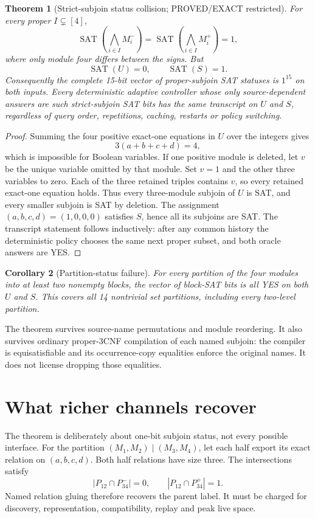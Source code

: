 \documentclass[11pt]{article}
\newtheorem{theorem}{Theorem}
\newtheorem{corollary}[theorem]{Corollary}
\newcommand{\SAT}{\operatorname{SAT}}
\begin{document}
\begin{theorem}[Strict-subjoin status collision; PROVED/EXACT restricted]
For every proper \(I\subsetneq[4]\),
\[
\SAT\!\left(\bigwedge_{i\in I}M_i^-\right)=
\SAT\!\left(\bigwedge_{i\in I}M_i^+\right)=1,
\]
where only module four differs between the signs.  But
\[
\SAT(U)=0,\qquad \SAT(S)=1.
\]
Consequently the complete 15-bit vector of proper-subjoin SAT statuses is
\(1^{15}\) on both inputs.  Every deterministic adaptive controller whose
only source-dependent answers are such strict-subjoin SAT bits has the same
transcript on \(U\) and \(S\), regardless of query order, repetitions,
caching, restarts or policy switching.
\end{theorem}
\begin{proof}
Summing the four positive exact-one equations in \(U\) over the integers gives
\[
3(a+b+c+d)=4,
\]
which is impossible for Boolean variables.  If one positive module is
deleted, let \(v\) be the unique variable omitted by that module.  Set
\(v=1\) and the other three variables to zero.  Each of the three retained
triples contains \(v\), so every retained exact-one equation holds.  Thus
every three-module subjoin of \(U\) is SAT, and every smaller subjoin is SAT
by deletion.  The assignment \((a,b,c,d)=(1,0,0,0)\) satisfies \(S\), hence
all its subjoins are SAT.  The transcript statement follows inductively:
after any common history the deterministic policy chooses the same next
proper subset, and both oracle answers are YES.
\end{proof}

\begin{corollary}[Partition-status failure]
For every partition of the four modules into at least two nonempty blocks,
the vector of block-SAT bits is all YES on both \(U\) and \(S\).  This covers
all 14 nontrivial set partitions, including every two-level partition.
\end{corollary}

The theorem survives source-name permutations and module reordering.  It
also survives ordinary proper-3CNF compilation of each named subjoin:
the compiler is equisatisfiable and its occurrence-copy equalities enforce
the original names.  It does not license dropping those equalities.

\section{What richer channels recover}
The theorem is deliberately about one-bit subjoin status, not every possible
interface.  For the partition \((M_1,M_2)\mid(M_3,M_4)\), let each half
export its exact relation on \((a,b,c,d)\).  Both half relations have size
three.  The intersections satisfy
\[
|P_{12}\cap P_{34}^-|=0,\qquad
|P_{12}\cap P_{34}^+|=1.
\]
Named relation gluing therefore recovers the parent label.  It must be
charged for discovery, representation, compatibility, replay and peak live
space.
\end{document}
